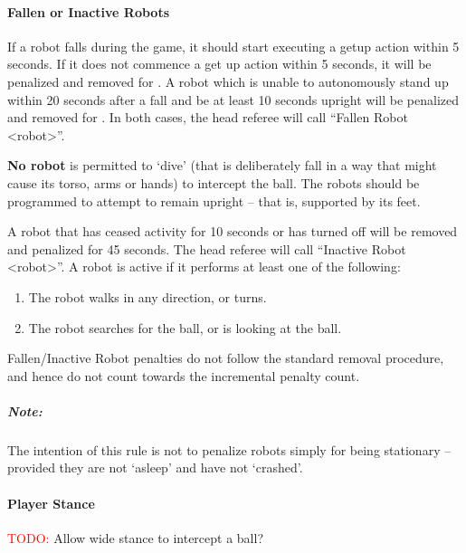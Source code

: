 \paragraph{Fallen or Inactive Robots}
\label{sec:fallenrobots}

If a robot falls during the game, it should start executing a getup action within 5 seconds. If it does not commence a get up action within 5 seconds, it will be penalized and removed for \StandardPenaltyTime.
A robot which is unable to autonomously stand up within 20 seconds after a fall and be at least 10 seconds upright will be penalized and removed for \StandardPenaltyTime. 
In both cases, the head referee will call ``Fallen Robot  \textless robot\textgreater''.

\textbf{No robot} is permitted to `dive' (that is deliberately fall in a way that might cause its torso, arms or hands) to intercept the ball. The robots should be programmed to attempt to remain upright -- that is, supported by its feet.

A robot that has ceased activity for 10 seconds or has turned off will be removed and penalized for 45 seconds.
The head referee will call ``Inactive Robot  \textless robot\textgreater''.
A robot is active if it performs at least one of the following:
\begin{enumerate}
	\item The robot walks in any direction, or turns.
	\item The robot searches for the ball, or is looking at the ball.
\end{enumerate}

Fallen/Inactive Robot penalties do not follow the standard removal procedure, and hence do not count towards the incremental penalty count.

\subparagraph{Note:} The intention of this rule is not to penalize robots simply for being stationary -- provided they are not `asleep' and have not `crashed'.

\paragraph{Player Stance}
\label{sec:player_stance}

\textcolor{red}{TODO:} Allow wide stance to intercept a ball?


